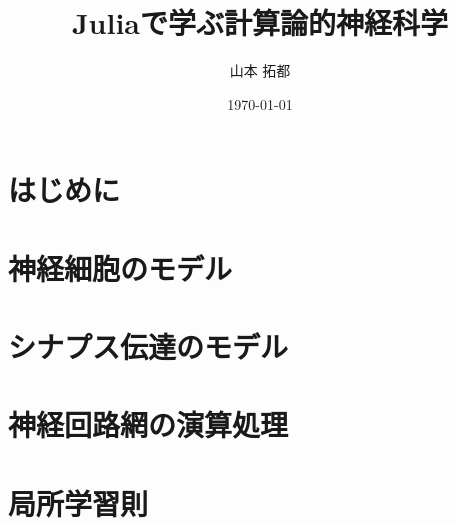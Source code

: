 \documentclass[titlepage]{ltjsbook}
\title{\Huge \textbf{Juliaで学ぶ計算論的神経科学}}
\author{\huge 山本 拓都}
\date{\huge \today}
\begin{document}
\maketitle

\setcounter{tocdepth}{2}
\tableofcontents
\clearpage
\chapter{はじめに}

\chapter{神経細胞のモデル}
% 
% 
%  

\chapter{シナプス伝達のモデル}
% 
% 
% 
% 

\chapter{神経回路網の演算処理}

\chapter{局所学習則}
% 
% 
% 
\end{document}
